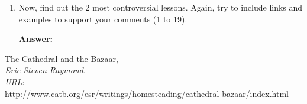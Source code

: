 \documentclass[11pt]{scrartcl}
\begin{document}
\begin{enumerate}
			\indent A sample of spread code could be \emph{Android SDK}\footnote{http://source.android.com/source/downloading.html}. I know, Google only release source code when he wants, but this is not the question, is how code release help your development increases capabilities, gets strong and it's used for more and more people and therefore your beta-tester 'database' increases everyday.
			
		\item Now, find out the 2 most controversial lessons. Again, try to include links and examples to support your comments (1 to 19).

			\textbf{Answer:}
	\end{enumerate}

\begin{thebibliography}{9}

	  The Cathedral and the Bazaar,\\
	  \emph{Eric Steven Raymond}.\\
	  \emph{URL}:\\http://www.catb.org/esr/writings/homesteading/cathedral-bazaar/index.html
	  
\end{thebibliography}
\end{document}
